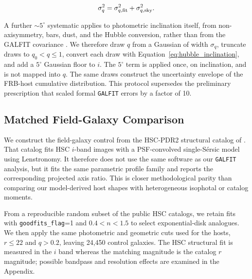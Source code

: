 \documentclass[10pt,twocolumn]{article}
\begin{document}
\begin{equation}
\sigma_q^2
=\sigma_{q,\rm fit}^2+\sigma_{q,\rm sky}^2.
\label{eq:q_uncertainty}
\end{equation}

A further $\sim5^\circ$ systematic applies to photometric inclination itself,
from non-axisymmetry, bars, dust, and the Hubble conversion, rather than from
the GALFIT covariance \citep{2003AJ....125.1164B,2024Natur.634.1065B}.
We therefore draw $q$ from a Gaussian of width $\sigma_q$, truncate draws to
$q_0<q\leq1$, convert each draw with Equation~\ref{eq:hubble_inclination}, and
add a $5^\circ$ Gaussian floor to $i$.  The $5^\circ$ term is applied once, on
inclination, and is not mapped into $q$.  The same draws construct the
uncertainty envelope of the FRB-host cumulative distribution.  This protocol
supersedes the preliminary prescription that scaled formal \texttt{GALFIT}
errors by a factor of 10.


\subsection{Matched Field-Galaxy Comparison}
\label{subsec:control}

We construct the field-galaxy control from the HSC-PDR2 structural catalog of
\citet{2021ApJ...921...38K}.  That catalog fits HSC $i$-band images with a
PSF-convolved single-S\'ersic model using Lenstronomy.  It therefore does not
use the same software as our \texttt{GALFIT} analysis, but it fits the same
parametric profile family and reports the corresponding projected axis ratio.
This is closer methodological parity than comparing our model-derived host
shapes with heterogeneous isophotal or catalog moments.

From a reproducible random subset of the public HSC catalogs, we retain fits
with \texttt{goodfits\_flag}=1 and $0.4<n<1.5$ to select exponential-disk
analogues.  We then apply the same photometric and geometric cuts used for the
hosts, $r\leq22$ and $q>0.2$, leaving 24,450 control galaxies.  The HSC
structural fit is measured in the $i$ band whereas the matching magnitude is
the catalog $r$ magnitude; possible bandpass and resolution effects are
examined in the Appendix.
\end{document}
